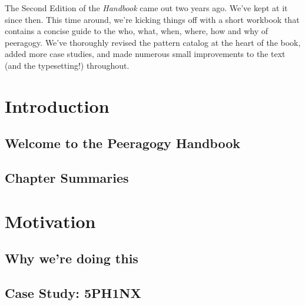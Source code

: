 \documentclass[ebook, 12pt, twoside]{memoir}
\begin{document}
The Second Edition of the \emph{Handbook} came out two years ago.
We've kept at it since then.  This time around, we're kicking things
off with a short workbook that contains a concise guide to the who,
what, when, where, how and why of peeragogy.  We've thoroughly revised
the pattern catalog at the heart of the book, added more case studies,
and made numerous small improvements to the text (and the
typesetting!)  throughout.

\clearpage

\mainmatter

\part{Introduction} \label{intro-part} %
\pagestyle{companion}
\chapter[\textbf{Welcome!}]{Welcome to the Peeragogy Handbook}
%


\newpage


\chapter[\textbf{Chapter Summaries}]{Chapter Summaries}
%


\part{Motivation} \label{motivation-part} %
%
\chapter[\textbf{Why we're doing this}]{Why we're doing this}

%
\chapter[\textbf{Case Study: 5PH1NX}]{Case Study: 5PH1NX}\label{sphinx-beginning}
%

\end{document}
